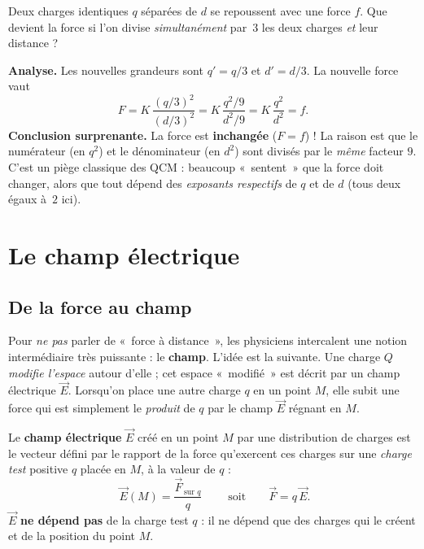 \documentclass[11pt,a4paper]{article}
\newcommand{\vc}[1]{\vec{#1}}
\begin{document}
\begin{exemple}
Deux charges identiques $q$ séparées de $d$ se repoussent avec une force $f$. Que devient la force
si l'on divise \emph{simultanément} par~$3$ les deux charges \emph{et} leur distance ?

\textbf{Analyse.} Les nouvelles grandeurs sont $q' = q/3$ et $d' = d/3$. La nouvelle force vaut
\[ F = K\,\frac{(q/3)^2}{(d/3)^2} = K\,\frac{q^2/9}{d^2/9} = K\,\frac{q^2}{d^2} = f. \]
\textbf{Conclusion surprenante.} La force est \textbf{inchangée} ($F=f$) ! La raison est que le
numérateur (en $q^2$) et le dénominateur (en $d^2$) sont divisés par le \emph{même} facteur $9$.
C'est un piège classique des QCM : beaucoup «~sentent~» que la force doit changer, alors que tout
dépend des \emph{exposants respectifs} de $q$ et de $d$ (tous deux égaux à~$2$ ici).
\end{exemple}

\section{Le champ électrique}

\subsection{De la force au champ}

Pour \emph{ne pas} parler de «~force à distance~», les physiciens intercalent une notion
intermédiaire très puissante : le \textbf{champ}. L'idée est la suivante. Une charge $Q$ \emph{modifie
l'espace} autour d'elle ; cet espace «~modifié~» est décrit par un champ électrique $\vc{E}$. Lorsqu'on
place une autre charge $q$ en un point $M$, elle subit une force qui est simplement le \emph{produit}
de $q$ par le champ $\vc{E}$ régnant en $M$.

\begin{definition}
Le \textbf{champ électrique} $\vc{E}$ créé en un point $M$ par une distribution de charges est le
vecteur défini par le rapport de la force qu'exercent ces charges sur une \emph{charge test}
positive $q$ placée en $M$, à la valeur de $q$ :
\[ \boxed{\;\vc{E}(M) = \dfrac{\vc{F}_{\,\text{sur }q}}{q}\;}\qquad
   \text{soit}\qquad \vc{F} = q\,\vc{E}. \]
$\vc{E}$ \textbf{ne dépend pas} de la charge test $q$ : il ne dépend que des charges qui le créent
et de la position du point $M$.
\end{definition}
\end{document}
